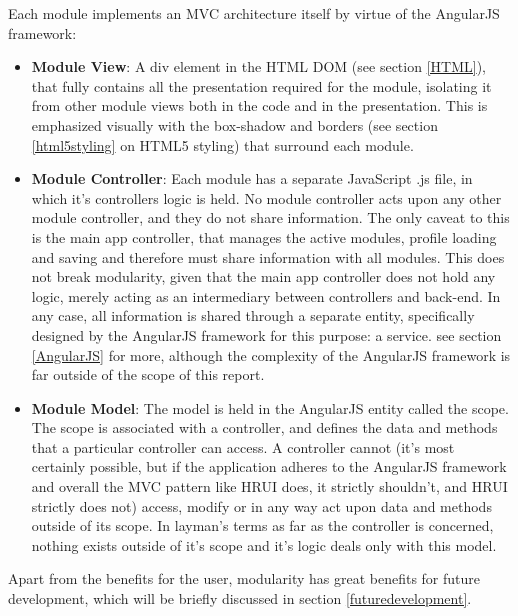 Each module implements an MVC architecture itself by virtue of the AngularJS framework:
\begin{itemize}
	\item \textbf{Module View}: A div element in the HTML DOM (see section \ref{HTML}), that fully contains all the 
	presentation required for the module, isolating it from other module views both in the code and in the presentation. This 
	is emphasized visually with the box-shadow and borders (see section \ref{html5styling} on HTML5 styling) that surround 
	each module.
	\item \textbf{Module Controller}: Each module has a separate JavaScript .js file, in which it's controllers logic is held. 
	No module controller acts upon any other module controller, and they do not share information. The only caveat to this is 
	the main app controller, that manages the active modules, profile loading and saving and therefore must share information 
	with all modules. This does not break modularity, given that the main app controller does not hold any logic, merely 
	acting as an intermediary between controllers and back-end. In any case, all information is shared through a separate 
	entity, specifically designed by the AngularJS framework for this purpose: a service. see section \ref{AngularJS} for 
	more, although the complexity of the AngularJS framework is far outside of the scope of this report.	
	\item \textbf{Module Model}: The model is held in the AngularJS entity called the scope. The scope is associated with a 
	controller, and defines the data and methods that a particular controller can access. A controller cannot (it's most 
	certainly possible, but if the application adheres to the AngularJS framework and overall the MVC pattern like HRUI does, 
	it strictly shouldn't, and HRUI strictly does not) access, modify or in any way act upon data and methods outside of its 
	scope. In layman's terms as far as the controller is concerned, nothing exists outside of it's scope and it's logic deals 
	only with this model.
\end{itemize}

Apart from the benefits for the user, modularity has great benefits for future development, which will be briefly discussed in 
section \ref{futuredevelopment}.\\

